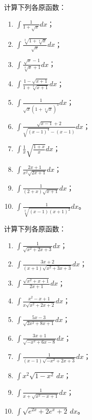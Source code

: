 \begin{exercise}
	\item 计算下列各原函数：
	\begin{enumerate}[label=\arabic*)]
		\item \(\displaystyle\int\frac1{1+\sqrt{x}}dx\)；
		\item \(\displaystyle\int\frac{\sqrt[3]{1+\sqrt[4]{x}}}{\sqrt{x}}dx\)；
		\item \(\displaystyle\int\frac{\sqrt{x}-1}{\sqrt[3]{x}+1}dx\)；
		\item \(\displaystyle\int\frac{1-\sqrt{x+1}}{1+\sqrt[3]{x+1}}dx\)；
		\item \(\displaystyle\int\frac1{\sqrt{x}(1+\sqrt[4]{x})^3}dx\)；
		\item \(\displaystyle\int\frac{\sqrt{x-1}+2}{\sqrt{(x-1)^4}-(x-1)}dx\)；
		\item \(\displaystyle\int\frac1x\sqrt{\frac{1+x}{x}}dx\)；
		\item \(\displaystyle\int\frac{2x+1}{x^2\sqrt{2x+1}}dx\)；
		\item \(\displaystyle\int\frac1{(2+x)\sqrt{x+1}}dx\)；
		\item \(\displaystyle\int\frac1{\sqrt[3]{(x-1)(x+1)^2}}dx\)。
	\end{enumerate}
\end{exercise}

\begin{exercise}
	\item 计算下列各原函数：
	\begin{enumerate}[label=\arabic*)]
		\item \(\displaystyle\int\frac1{\sqrt{x^2+2x+3}}dx\)；
		\item \(\displaystyle\int\frac{3x+2}{(x+1)\sqrt{x^2+3x+3}}dx\)；
		\item \(\displaystyle\int\frac{\sqrt{x^2+x+1}}{2x+1}dx\)；
		\item \(\displaystyle\int\frac{x^2-x+1}{x\sqrt{x^2+2x+2}}dx\)；
		\item \(\displaystyle\int\frac{5x-3}{\sqrt{2x^2+8x+1}}dx\)；
		\item \(\displaystyle\int\frac{3x+1}{\sqrt{-x^2+6x-8}}dx\)；
		\item \(\displaystyle\int\frac1{(x-1)\sqrt{-x^2+2x+3}}dx\)；
		\item \(\displaystyle\int x^2\sqrt{1-x^2}\,dx\)；
		\item \(\displaystyle\int\frac1{x+\sqrt{x^2-x+1}}dx\)；
		\item \(\displaystyle\int\sqrt{e^{2x}+2e^x+2}\,dx\)。
	\end{enumerate}
\end{exercise}

